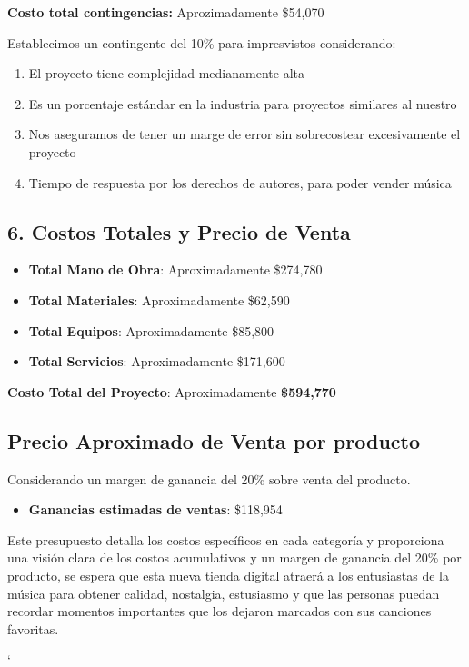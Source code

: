 \documentclass[12pt]{article}
\begin{document}
\textbf{Costo total contingencias:} Aprozimadamente \$54,070

Establecimos un contingente del 10\% para impresvistos considerando:

\begin{enumerate}
	\item El proyecto tiene complejidad medianamente alta
	\item Es un porcentaje estándar en la industria para proyectos similares al nuestro
	\item Nos aseguramos de tener un marge de error sin sobrecostear excesivamente el proyecto
	\item Tiempo de respuesta por los derechos de autores, para poder vender música
\end{enumerate} 

\subsection*{6. Costos Totales y Precio de Venta}
\begin{itemize}
    \item \textbf{Total Mano de Obra}: Aproximadamente \$274,780
    \item \textbf{Total Materiales}: Aproximadamente \$62,590
    \item \textbf{Total Equipos}: Aproximadamente \$85,800
    \item \textbf{Total Servicios}: Aproximadamente \$171,600
\end{itemize}

\textbf{Costo Total del Proyecto}: Aproximadamente \textbf{\$594,770}

\subsection*{Precio Aproximado de Venta por producto}
Considerando un margen de ganancia del 20\% sobre venta del producto.

\begin{itemize}
    \item \textbf{Ganancias estimadas de ventas}: \$118,954
\end{itemize}

Este presupuesto detalla los costos específicos en cada categoría y proporciona una visión clara de los costos acumulativos y un margen de ganancia del 20\% por producto, se espera que esta nueva tienda digital atraerá a los entusiastas de la música para obtener calidad, nostalgia, estusiasmo y que las personas puedan recordar momentos importantes que los dejaron marcados con sus canciones favoritas.


`
\end{document}
